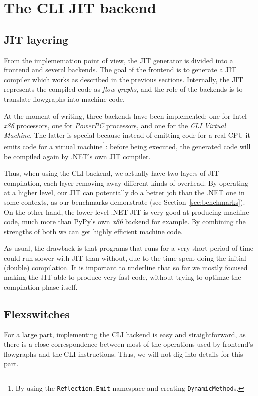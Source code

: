 \section{The CLI JIT backend}
\label{sec:clibackend}

\subsection{JIT layering}

From the implementation point of view, the JIT generator is divided into a
frontend and several backends.  The goal of the frontend is to generate a JIT
compiler which works as described in the previous sections.  Internally, the
JIT represents the compiled code as \emph{flow graphs}, and the role of
the backends is to translate flowgraphs into machine code.

At the moment of writing, three backends have been implemented: one for Intel
\emph{x86} processors, one for \emph{PowerPC} processors, and one for the
\emph{CLI Virtual Machine}.  The latter is special because instead of emitting
code for a real CPU it emits code for a virtual machine\footnote{By using the 
\lstinline{Reflection.Emit} namespace and creating \lstinline{DynamicMethod}s.}: 
before being
executed, the generated code will be compiled again by .NET's own JIT
compiler.

Thus, when using the CLI backend, we actually have two layers of
JIT-compilation, each layer removing away different kinds of overhead.  By
operating at a higher level, our JIT can potentially do a better job than the
.NET one in some contexts, as our benchmarks demonstrate (see
Section~\ref{sec:benchmarks}).  On the other hand, the lower-level .NET JIT is
very good at producing machine code, much more than PyPy's own \emph{x86}
backend for example.  By combining the strengths of both we can get highly
efficient machine code.

As usual, the drawback is that programs that runs for a very short period of
time could run slower with JIT than without, due to the time spent doing the
initial (double) compilation.  It is important to underline that so far we
mostly focused making the JIT able to produce very fast code, without trying
to optimze the compilation phase itself.

\subsection{Flexswitches}

For a large part, implementing the CLI backend is easy and straightforward, as
there is a close correspondence between most of the operations used by
frontend's flowgraphs and the CLI instructions.  Thus, we will not dig into
details for this part.

